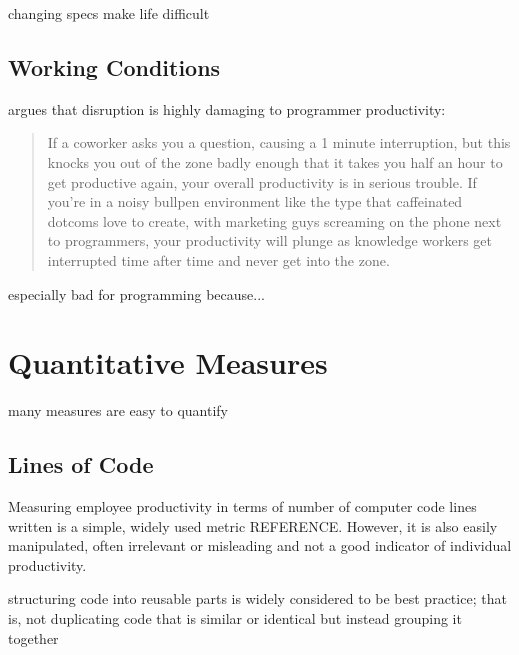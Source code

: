 \documentclass[letterpaper, 10pt]{report}
\begin{document}
changing specs make life difficult


\subsection{Working Conditions}
\textcite{spolsky:list} argues that disruption is highly damaging to programmer productivity:
\begin{quote}
If a coworker asks you a question, causing a 1 minute interruption, but this knocks you out of the zone badly enough that it takes you half an hour to get productive again, your overall productivity is in serious trouble. 
If you're in a noisy bullpen environment like the type that caffeinated dotcoms love to create, with marketing guys screaming on the phone next to programmers, your productivity will plunge as knowledge workers get interrupted time after time and never get into the zone.
\end{quote}

especially bad for programming because...




\section{Quantitative Measures}
many measures are easy to quantify



\subsection{Lines of Code}
Measuring employee productivity in terms of number of computer code lines written is a simple, widely used metric REFERENCE. 
However, it is also easily manipulated, often irrelevant or misleading and not a good indicator of individual productivity.

structuring code into reusable parts is widely considered to be best practice; that is, not duplicating code that is similar or identical but instead grouping it together
\end{document}
